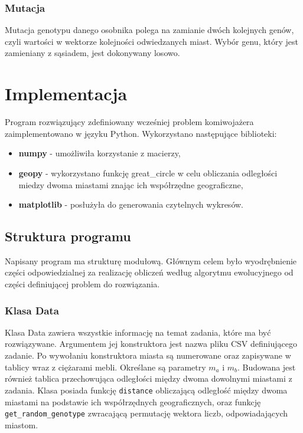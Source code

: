 \documentclass[12pt, oneside, final]{report}
\begin{document}
\subsection{Mutacja}
Mutacja genotypu danego osobnika polega na zamianie dwóch kolejnych genów, czyli wartości w wektorze kolejności odwiedzanych miast. Wybór genu, który jest zamieniany z sąsiadem, jest dokonywany losowo.

\chapter{Implementacja}
Program rozwiązujący zdefiniowany wcześniej problem komiwojażera zaimplementowano w języku Python. Wykorzystano następujące biblioteki:
\begin{itemize}
\item \textbf{numpy} - umożliwiła korzystanie z macierzy,
\item \textbf{geopy} - wykorzystano funkcję great\_circle w celu obliczania odległości miedzy dwoma miastami znając ich współrzędne geograficzne,
\item \textbf{matplotlib} - posłużyła do generowania czytelnych wykresów.
\end{itemize}

\section{Struktura programu}
Napisany program ma strukturę modułową. Głównym celem było wyodrębnienie części odpowiedzialnej za realizację obliczeń według algorytmu ewolucyjnego od części definiującej problem do rozwiązania.

\subsection{Klasa Data}
Klasa Data zawiera wszystkie informację na temat zadania, które ma być rozwiązywane. Argumentem jej konstruktora jest nazwa pliku CSV definiującego zadanie. Po wywołaniu konstruktora miasta są numerowane oraz zapisywane w tablicy wraz z ciężarami mebli. Określane są parametry $m_a$ i $m_b$. Budowana jest również tablica przechowująca odległości między dwoma dowolnymi miastami z zadania. Klasa posiada funkcję \texttt{distance} obliczającą odległość między dwoma miastami na podstawie ich współrzędnych geograficznych, oraz funkcję \texttt{get\_random\_genotype} zwracającą permutację wektora liczb, odpowiadających miastom.
\end{document}
